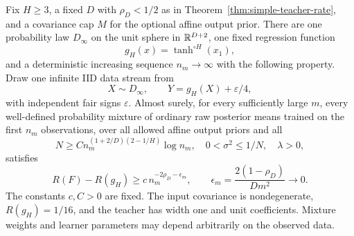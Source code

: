 \begin{theorem}
\label{thm:fixed-law-rate}
Fix $H\ge3$, a fixed $D$ with $\rho_D<1/2$ as in Theorem~\ref{thm:simple-teacher-rate}, and a covariance cap $M$ for the optional affine output prior. There are one probability law $D_\infty$ on the unit sphere in $\mathbb R^{D+2}$, one fixed regression function
\[
 g_H(x)=\tanh^{\circ H}(x_1),
\]
and a deterministic increasing sequence $n_m\to\infty$ with the following property. Draw one infinite IID data stream from
\[
 X\sim D_\infty,\qquad Y=g_H(X)+\varepsilon/4,
\]
with independent fair signs $\varepsilon$. Almost surely, for every sufficiently large $m$, every well-defined probability mixture of ordinary raw posterior means trained on the first $n_m$ observations, over all allowed affine output priors and all
\[
 N\ge C n_m^{(1+2/D)(2-1/H)}\log n_m,
 \quad 0<\sigma^2\le1/N,
 \quad \lambda>0,
\]
satisfies
\begin{equation}
 R(F)-R(g_H)\ge c\,n_m^{-2\rho_D-\epsilon_m},
 \qquad \epsilon_m=\frac{2(1-\rho_D)}{Dm^2}\longrightarrow0.
 \label{eq:fixed-law-rate}
\end{equation}
The constants $c,C>0$ are fixed. The input covariance is nondegenerate, $R(g_H)=1/16$, and the teacher has width one and unit coefficients. Mixture weights and learner parameters may depend arbitrarily on the observed data.
\end{theorem}
